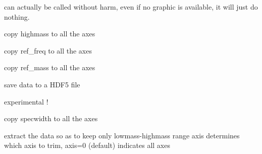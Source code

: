 \documentclass[letterpaper,10pt,openany,oneside]{sphinxmanual}
\begin{document}
\begin{fulllineitems}
\begin{fulllineitems}
can actually be called without harm, even if no graphic is available, it will just do nothing.

\end{fulllineitems}


\begin{fulllineitems}
\label{rst/code:Orbitrap.OrbiData.highmass}
copy highmass to all the axes

\end{fulllineitems}


\begin{fulllineitems}
\label{rst/code:Orbitrap.OrbiData.ref_freq}
copy ref\_freq to all the axes

\end{fulllineitems}


\begin{fulllineitems}
\label{rst/code:Orbitrap.OrbiData.ref_mass}
copy ref\_mass to all the axes

\end{fulllineitems}


\begin{fulllineitems}
\label{rst/code:Orbitrap.OrbiData.save_msh5}
save data to a HDF5 file

experimental !

\end{fulllineitems}


\begin{fulllineitems}
\label{rst/code:Orbitrap.OrbiData.specwidth}
copy specwidth to all the axes

\end{fulllineitems}


\begin{fulllineitems}
\label{rst/code:Orbitrap.OrbiData.trimz}
extract the data so as to keep only lowmass-highmass range
axis determines which axis to trim, axis=0 (default) indicates all axes


\end{fulllineitems}
\end{fulllineitems}
\end{document}
